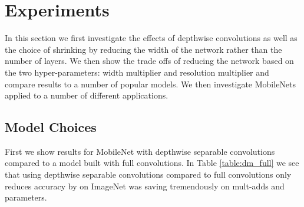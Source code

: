 \documentclass[10pt,twocolumn,letterpaper]{article}
\begin{document}
\begin{table}[t]
  \caption{Resource usage for modifications to standard convolution. Note that each row is a cumulative effect adding on top of the previous row. This example is for an internal MobileNet layer with , , , .} \centering {}
\end{table}

\section{Experiments} \label{sec:exp}

In this section we first investigate the effects of depthwise convolutions as well as the choice of shrinking by reducing the width of the network rather than the number of layers. We then show the trade offs of reducing the network based on the two hyper-parameters: width multiplier and resolution multiplier and compare results to a number of popular models. We then investigate MobileNets applied to a number of different applications.

\subsection{Model Choices}
First we show results for MobileNet with depthwise separable convolutions compared to a model built with full convolutions. In Table \ref{table:dm_full} we see that using depthwise separable convolutions compared to full convolutions only reduces accuracy by  on ImageNet was saving tremendously on mult-adds and parameters.

\begin{table}[t]
  \caption{Depthwise Separable vs Full Convolution MobileNet} \centering {}
\end{table}
\end{document}
